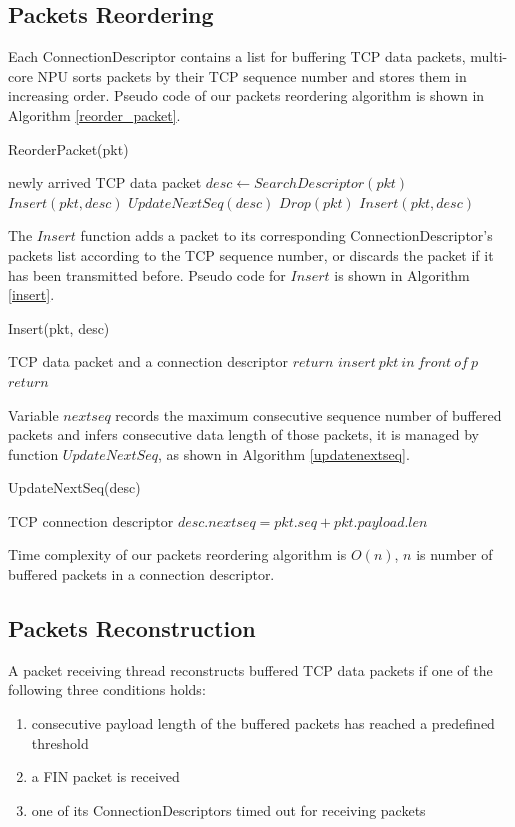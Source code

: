 \documentclass[conference]{IEEEtran}
\begin{document}
\subsection{Packets Reordering}
Each ConnectionDescriptor contains a list for buffering TCP data packets, multi-core NPU sorts packets by their TCP sequence number and stores them in increasing order. Pseudo code of our packets reordering algorithm is shown in Algorithm \ref{reorder_packet}.
\begin{algorithm}
\caption{ReorderPacket(pkt)}
\label{reorder_packet}
\begin{algorithmic}
\REQUIRE newly arrived TCP data packet
\STATE $desc \leftarrow SearchDescriptor(pkt)$
\STATE $Insert(pkt, desc)$
\STATE $UpdateNextSeq(desc)$
\ELSE {}
    \STATE $Drop(pkt)$
    \ELSE \STATE $Insert(pkt, desc)$
    \ENDIF
\ENDIF
\end{algorithmic}
\end{algorithm}
The $Insert$ function adds a packet to its corresponding ConnectionDescriptor's packets list according to the TCP sequence number, or discards the packet if it has been transmitted before. Pseudo code for $Insert$ is shown in Algorithm \ref{insert}.
\begin{algorithm}
\caption{Insert(pkt, desc)}
\label{insert}
\begin{algorithmic}
\REQUIRE TCP data packet and a connection descriptor
\STATE $return$
\ELSE {}
    \STATE $insert\ pkt\ in\ front\ of\ p$
    \STATE $return$
    \ENDIF
\ENDIF
\ENDFOR
\end{algorithmic}
\end{algorithm}
Variable $nextseq$ records the maximum consecutive sequence number of buffered packets and infers consecutive data length of those packets, it is managed by function $UpdateNextSeq$, as shown in Algorithm \ref{updatenextseq}.
\begin{algorithm}
\caption{UpdateNextSeq(desc)}
\label{updatenextseq}
\begin{algorithmic}
\REQUIRE TCP connection descriptor
\STATE $desc.nextseq = pkt.seq + pkt.payload.len$
\ENDIF
\ENDFOR
\end{algorithmic}
\end{algorithm}
Time complexity of our packets reordering algorithm is $O(n)$, $n$ is number of buffered packets in a connection descriptor.
\subsection{Packets Reconstruction}
A packet receiving thread reconstructs buffered TCP data packets if one of the following three conditions holds:
\begin{enumerate}
\item consecutive payload length of the buffered packets has reached a predefined threshold
\item a FIN packet is received
\item one of its ConnectionDescriptors timed out for receiving packets
\end{enumerate}
\end{document}
